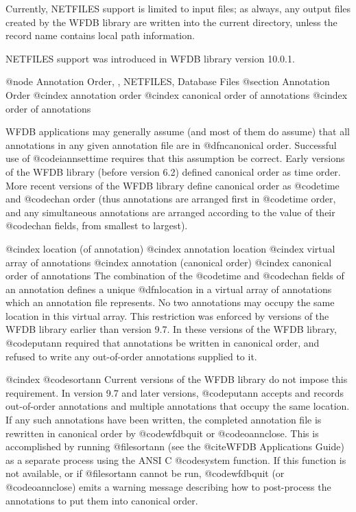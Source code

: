 {{{{{{{{{{Currently, NETFILES support is limited to input files; as always, any output
files created by the WFDB library are written into the current directory,
unless the record name contains local path information.

NETFILES support was introduced in WFDB library version 10.0.1.

@node     Annotation Order, , NETFILES, Database Files
@section Annotation Order
@cindex annotation order
@cindex canonical order of annotations
@cindex order of annotations

WFDB applications may generally assume (and most of them do assume) that
all annotations in any given annotation file are in @dfn{canonical
order}.  Successful use of @code{iannsettime} requires that this assumption
be correct.  Early versions of the WFDB library (before version 6.2) defined
canonical order as time order.  More recent versions of the WFDB library define
canonical order as @code{time} and @code{chan} order (thus annotations
are arranged first in @code{time} order, and any simultaneous annotations are
arranged according to the value of their @code{chan} fields, from
smallest to largest).  

@cindex location (of annotation)
@cindex annotation location
@cindex virtual array of annotations
@cindex annotation (canonical order)
@cindex canonical order of annotations
The combination of the @code{time} and @code{chan} fields of an
annotation defines a unique @dfn{location} in a virtual array of
annotations which an annotation file represents.  No two annotations may
occupy the same location in this virtual array.  This restriction was
enforced by versions of the WFDB library earlier than version 9.7.  In
these versions of the WFDB library, @code{putann} required that
annotations be written in canonical order, and refused to write any
out-of-order annotations supplied to it.

@cindex @code{sortann}
Current versions of the WFDB library do not impose this requirement.  In version
9.7 and later versions, @code{putann} accepts and records out-of-order
annotations and multiple annotations that occupy the same location.  If any
such annotations have been written, the completed annotation file is rewritten
in canonical order by @code{wfdbquit} or @code{oannclose}.  This is accomplished
by running @file{sortann} (see the @cite{WFDB Applications
Guide}) as a separate process using the ANSI C @code{system} function.  If this
function is not available, or if @file{sortann} cannot be run, @code{wfdbquit}
(or @code{oannclose}) emits a warning message describing how to post-process
the annotations to put them into canonical order.

}}}}}}}}}}
